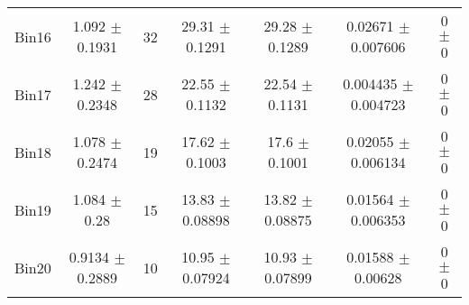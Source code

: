 \begin{tabular}{@{\extracolsep{4pt}}lcccccc@{}}
     Bin16 & 1.092 $\pm$ 0.1931 & 32 & 29.31 $\pm$ 0.1291 & 29.28 $\pm$ 0.1289 & 0.02671 $\pm$ 0.007606 & 0 $\pm$ 0 \\ 
     Bin17 & 1.242 $\pm$ 0.2348 & 28 & 22.55 $\pm$ 0.1132 & 22.54 $\pm$ 0.1131 & 0.004435 $\pm$ 0.004723 & 0 $\pm$ 0 \\ 
     Bin18 & 1.078 $\pm$ 0.2474 & 19 & 17.62 $\pm$ 0.1003 & 17.6 $\pm$ 0.1001 & 0.02055 $\pm$ 0.006134 & 0 $\pm$ 0 \\ 
     Bin19 & 1.084 $\pm$ 0.28 & 15 & 13.83 $\pm$ 0.08898 & 13.82 $\pm$ 0.08875 & 0.01564 $\pm$ 0.006353 & 0 $\pm$ 0 \\ 
     Bin20 & 0.9134 $\pm$ 0.2889 & 10 & 10.95 $\pm$ 0.07924 & 10.93 $\pm$ 0.07899 & 0.01588 $\pm$ 0.00628 & 0 $\pm$ 0 \\ 
\hline\hline
  \end{tabular}
